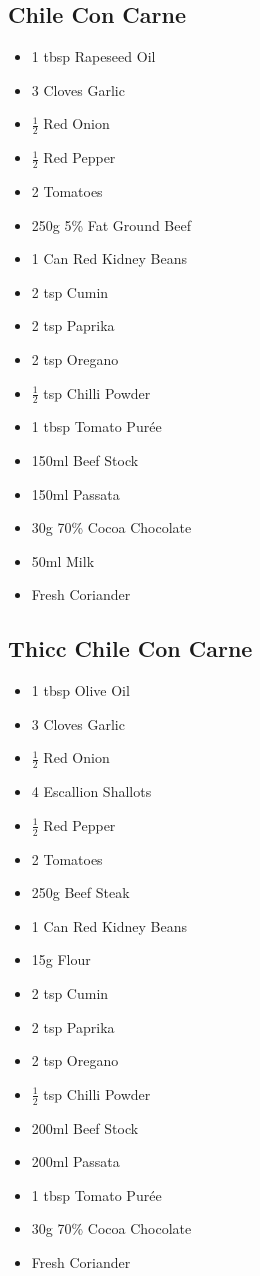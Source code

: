 \documentclass[11pt, english]{article}
\begin{document}
	\subsection{Chile Con Carne}

	\begin{itemize}
	\setlength\itemsep{0cm}
		\item 1 tbsp Rapeseed Oil
		\item 3 Cloves Garlic
		\item $\frac{1}{2}$ Red Onion
		\item $\frac{1}{2}$ Red Pepper
		\item 2 Tomatoes
		\item 250g 5\% Fat Ground Beef
		\item 1 Can Red Kidney Beans
		\item 2 tsp Cumin
		\item 2 tsp Paprika
		\item 2 tsp Oregano
		\item $\frac{1}{2}$ tsp Chilli Powder
		\item 1 tbsp Tomato Pur\'{e}e
		\item 150ml Beef Stock
		\item 150ml Passata
		\item 30g 70\% Cocoa Chocolate
		\item 50ml Milk
		\item Fresh Coriander
	\end{itemize}

\newpage
	
	\subsection{Thicc Chile Con Carne}

	\begin{itemize}
	\setlength\itemsep{0cm}
		\item 1 tbsp Olive Oil
		\item 3 Cloves Garlic
		\item $\frac{1}{2}$ Red Onion
		\item 4 Escallion Shallots
		\item $\frac{1}{2}$ Red Pepper
		\item 2 Tomatoes
		\item 250g Beef Steak
		\item 1 Can Red Kidney Beans
		\item 15g Flour
		\item 2 tsp Cumin
		\item 2 tsp Paprika
		\item 2 tsp Oregano
		\item $\frac{1}{2}$ tsp Chilli Powder
		\item 200ml Beef Stock
		\item 200ml Passata
		\item 1 tbsp Tomato Pur\'{e}e
		\item 30g 70\% Cocoa Chocolate
		\item Fresh Coriander
	\end{itemize}
\end{document}
